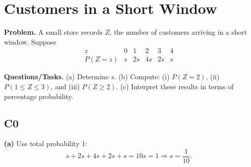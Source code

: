 		
		\section{Customers in a Short Window}
		
		\textbf{Problem.}
		A small store records $Z$, the number of customers arriving in a short window. Suppose
		\[
		\begin{array}{c|ccccc}
			z & 0 & 1 & 2 & 3 & 4\\
			\hline
			P(Z=z) & s & 2s & 4s & 2s & s
		\end{array}
		\]
		
		\textbf{Questions/Tasks.}
		(a) Determine $s$.
		(b) Compute: (i) $P(Z=2)$, (ii) $P(1\le Z\le 3)$, and (iii) $P(Z\ge 2)$.
		(c) Interpret these results in terms of percentage probability.
		
		\subsection*{C0}

		\textbf{(a)} Use total probability 1:
		\[
		s+2s+4s+2s+s=10s=1\Rightarrow s=\frac{1}{10}.
		\]

